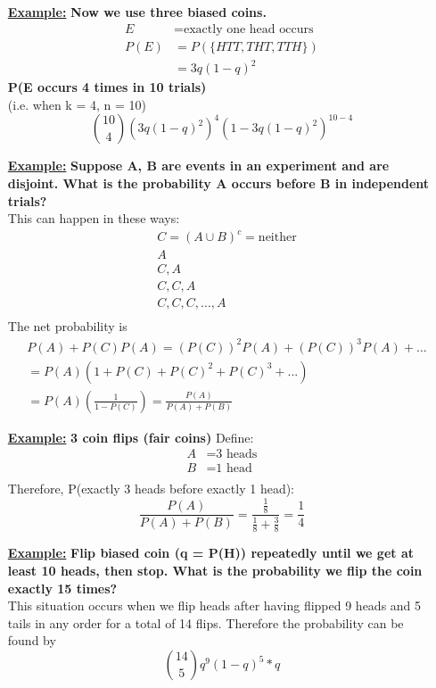 \documentclass[10pt]{article}
\begin{document}
\begin{flushleft}
\begin{itemize}
\item[\textbf{\underline{Example:}}] \textbf{Now we use three biased coins.}
    $$ \begin{aligned}
        E &=  \text{exactly one head occurs} \\
        P(E) &= P(\{HTT, THT, TTH\}) \\
             &= 3q(1 - q)^2
    \end{aligned}$$
    \textbf{P(E occurs 4 times in 10 trials)} \\
    (i.e. when k = 4, n = 10)
    $$ \binom{10}{4}(3q(1-q)^2)^4(1-3q(1-q)^2)^{10 - 4}$$

\item[\textbf{\underline{Example:}}] \textbf{Suppose A, B are events in an
    experiment and are disjoint. What is the probability A occurs before B in
independent trials?} \\
    This can happen in these ways:
    $$ \begin{aligned}
        &C = (A \cup B)^c = \text{neither} \\
        &A \\
        &C, A \\
        &C, C, A \\
        &C, C, C, ..., A \\
    \end{aligned} $$
    The net probability is 
    $$ \begin{aligned}
        &P(A) + P(C)P(A) = (P(C))^2P(A) + (P(C))^3P(A) + ...  \\
        &= P(A)(1 + P(C) + P(C)^2 + P(C)^3 + ... ) \\
        &= P(A)\left( \frac{1}{1 - P(C)} \right) = \frac{P(A)}{P(A) + P(B)}
    \end{aligned}$$

\item[\textbf{\underline{Example:}}] \textbf{3 coin flips (fair coins)}
    Define:
    $$ \begin{aligned}
        A &= \text{3 heads} \\
        B &= \text{1 head} \\
    \end{aligned} $$
    Therefore, P(exactly 3 heads before exactly 1 head):
    $$ \frac{P(A)}{P(A) + P(B)} = \frac{\frac{1}{8}}{\frac{1}{8} + \frac{3}{8}}
    = \frac{1}{4} $$
\item[\textbf{\underline{Example:}}] \textbf{Flip biased coin (q = P(H))
    repeatedly until we get at least 10 heads, then stop. What is the
probability we flip the coin exactly 15 times?} \\
This situation occurs when we flip heads after having flipped 9 heads and 5
tails in any order for a total of 14 flips. Therefore the probability can be
found by
$$ \binom{14}{5}q^9(1 - q)^5 * q $$


\end{itemize}
\end{flushleft}
\end{document}
